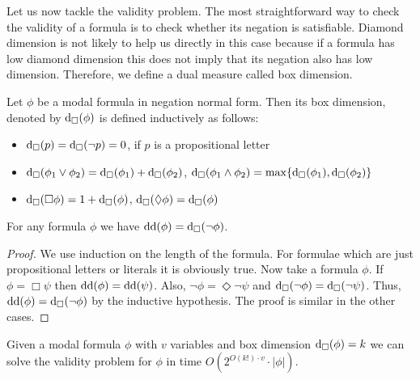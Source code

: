 \documentclass{llncs}
\newcommand{\dd}{\ensuremath \textrm{dd}}
\begin{document}
Let us now tackle the validity problem. The most straightforward way
to check the validity of a formula is to check whether its negation
is satisfiable. Diamond dimension is not likely to help us directly
in this case because if a formula has low diamond dimension this
does not imply that its negation also has low dimension. Therefore,
we define a dual measure called box dimension.

\begin{definition}

Let $\phi$ be a modal formula in negation normal form. Then its box dimension,
denoted by $\mathrm{d}_\Box(\phi)$ is defined inductively as follows:

\begin{itemize}

\item $\mathrm{d}_\Box(p)= \mathrm{d}_\Box(\neg p) = 0$, if $p$ is a propositional letter

\item $\mathrm{d}_\Box(\phi_1 \lor \phi_2) = \mathrm{d}_\Box(\phi_1) + \mathrm{d}_\Box(\phi_2)$,
$\mathrm{d}_\Box(\phi_1 \land \phi_2) = \max\{\mathrm{d}_\Box(\phi_1),\mathrm{d}_\Box(\phi_2) \}$

\item $\mathrm{d}_\Box(\Box \phi) = 1+ \mathrm{d}_\Box(\phi)$,  $\mathrm{d}_\Box(\Diamond \phi) = \mathrm{d}_\Box(\phi)$

\end{itemize}

\end{definition}

\begin{theorem}

For any formula $\phi$ we have $\dd(\phi) = \bd(\neg \phi)$.

\end{theorem}

\begin{proof}

We use induction on the length of the formula. For formulae which are just
propositional letters or literals it is obviously true. Now take a formula
$\phi$. If $\phi=\Box \psi$ then $\dd(\phi)=\dd(\psi)$. Also, $\neg \phi =
\Diamond \neg \psi$ and $\mathrm{d}_\Box(\neg \phi) = \mathrm{d}_\Box (\neg\psi)$. Thus, $\dd(\phi) =
\bd(\neg \phi)$ by the inductive hypothesis. The proof is similar in the other
cases.

\end{proof}

\begin{corollary}

Given a modal formula $\phi$ with $v$ variables and box dimension $\mathrm{d}_\Box(\phi)=k$
we can solve the validity problem for $\phi$ in time $O(2^{O(k!)\cdot
v}\cdot|\phi|)$.


\end{corollary}
 
\end{document}
